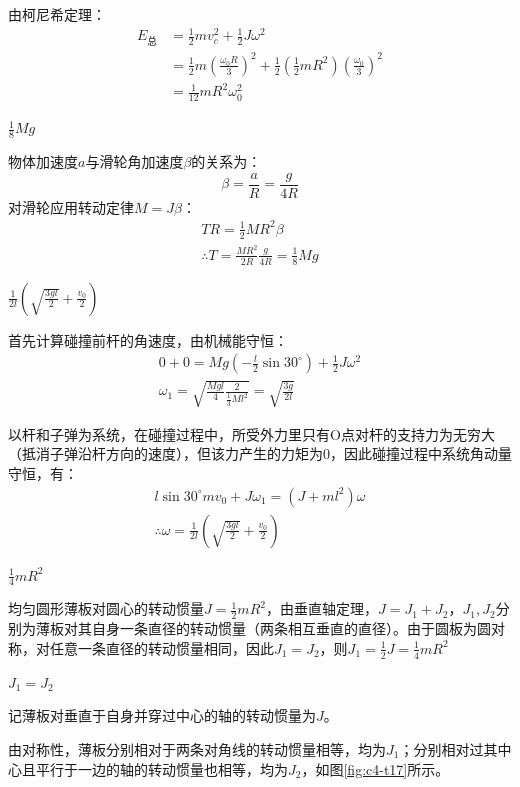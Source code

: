 \documentclass[b5paper,opensource,sourcefont,parskip]{qyxf-book}
\begin{document}
由柯尼希定理：
\begin{align*}
E_{\text{总}}&=\frac{1}{2}mv_c^2+\frac{1}{2}J\omega^2\\
&=\frac{1}{2}m\left(\frac{\omega_0R}{3}\right)^2+\frac{1}{2}\left(\frac{1}{2}mR^2\right)\left(\frac{\omega_0}{3}\right)^2\\
&=\frac{1}{12}mR^2\omega_0^2
\end{align*}

$\frac{1}{8}Mg$

\solve 物体加速度$ a $与滑轮角加速度$ \beta $的关系为：
\[\beta=\frac{a}{R}=\frac{g}{4R}\]
对滑轮应用转动定律$M=J\beta$：
\begin{gather*}
TR=\frac{1}{2}MR^2\beta\\
\therefore T=\frac{MR^2}{2R}\frac{g}{4R}=\frac{1}{8}Mg
\end{gather*}

$\frac{1}{2l}\left(\sqrt{\frac{3gl}{2}}+\frac{v_0}{2}\right)$

\solve 首先计算碰撞前杆的角速度，由机械能守恒：
\begin{gather*}
0+0=Mg(-\frac{l}{2}\sin 30^\circ)+\frac{1}{2}J\omega^2\\
\omega_1=\sqrt{\frac{Mgl}{4}\frac{2}{\frac{1}{3}Ml^2}}=\sqrt{\frac{3g}{2l}}
\end{gather*}

以杆和子弹为系统，在碰撞过程中，所受外力里只有O点对杆的支持力为无穷大（抵消子弹沿杆方向的速度），但该力产生的力矩为0，因此碰撞过程中系统角动量守恒，有：
\begin{gather*}
l\sin 30^\circ mv_0+J\omega_1=(J+ml^2)\omega\\
\therefore \omega=\frac{1}{2l}\left(\sqrt{\frac{3gl}{2}}+\frac{v_0}{2}\right)
\end{gather*}

$\frac{1}{4}mR^2$

\solve 均匀圆形薄板对圆心的转动惯量$ J=\frac{1}{2}mR^2 $，由垂直轴定理，$ J=J_1+J_2 $，$ J_1,J_2 $分别为薄板对其自身一条直径的转动惯量（两条相互垂直的直径）。由于圆板为圆对称，对任意一条直径的转动惯量相同，因此$ J_1=J_2 $，则$ J_1=\frac{1}{2}J=\frac{1}{4}mR^2 $

$J_1=J_2$

\solve 记薄板对垂直于自身并穿过中心的轴的转动惯量为$ J $。

由对称性，薄板分别相对于两条对角线的转动惯量相等，均为$J_1$；分别相对过其中心且平行于一边的轴的转动惯量也相等，均为$J_2$，如图\ref{fig:c4-t17}所示。
\end{document}
